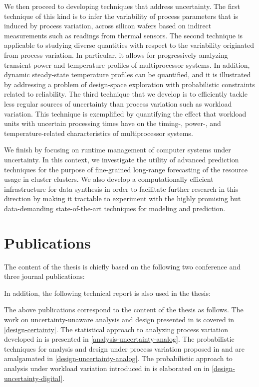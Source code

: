 We then proceed to developing techniques that address uncertainty. The first
technique of this kind is to infer the variability of process parameters that is
induced by process variation, across silicon wafers based on indirect
measurements such as readings from thermal sensors. The second technique is
applicable to studying diverse quantities with respect to the variability
originated from process variation. In particular, it allows for progressively
analyzing transient power and temperature profiles of multiprocessor systems. In
addition, dynamic steady-state temperature profiles can be quantified, and it is
illustrated by addressing a problem of design-space exploration with
probabilistic constraints related to reliability. The third technique that we
develop is to efficiently tackle less regular sources of uncertainty than
process variation such as workload variation. This technique is exemplified by
quantifying the effect that workload units with uncertain processing times have
on the timing-, power-, and temperature-related characteristics of
multiprocessor systems.

We finish by focusing on runtime management of computer systems under
uncertainty. In this context, we investigate the utility of advanced prediction
techniques for the purpose of fine-grained long-range forecasting of the
resource usage in cluster clusters. We also develop a computationally efficient
infrastructure for data synthesis in order to facilitate further research in
this direction by making it tractable to experiment with the highly promising
but data-demanding state-of-the-art techniques for modeling and prediction.

\section{Publications}

The content of the thesis is chiefly based on the following two conference and
three journal publications:

\printbibliography[heading=none,keyword=own]

In addition, the following technical report is also used in the thesis:

\printbibliography[heading=none,keyword=own-unpublished]

The above publications correspond to the content of the thesis as follows. The
work on uncertainty-unaware analysis and design presented in \cite{ukhov2012} is
covered in \cref{design-certainty}. The statistical approach to analyzing
process variation developed in \cite{ukhov2014a} is presented in
\cref{analysis-uncertainty-analog}. The probabilistic techniques for analysis
and design under process variation proposed in \cite{ukhov2014b} and
\cite{ukhov2015} are amalgamated in \cref{design-uncertainty-analog}. The
probabilistic approach to analysis under workload variation introduced in
\cite{ukhov2017a} is elaborated on in \cref{design-uncertainty-digital}.
